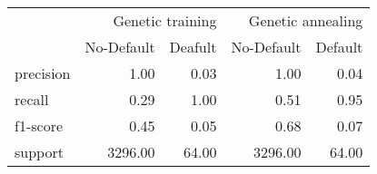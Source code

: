 \begin{table}
\thcenter
\begin{tabular}{lrrrr}
 & \multicolumn{2}{r}{Genetic training} & \multicolumn{2}{r}{Genetic annealing} \\
 & No-Default & Deafult & No-Default & Default \\
precision & 1.00 & 0.03 & 1.00 & 0.04 \\
recall & 0.29 & 1.00 & 0.51 & 0.95 \\
f1-score & 0.45 & 0.05 & 0.68 & 0.07 \\
support & 3296.00 & 64.00 & 3296.00 & 64.00 \\
\end{tabular}
\end{table}
